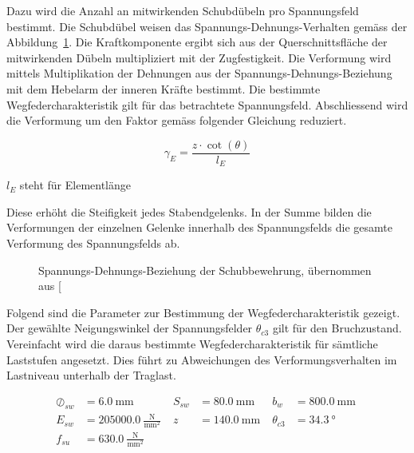 \documentclass[
  11pt,
  letterpaper,
]{scrreprt}
\begin{document}
Dazu wird die Anzahl an mitwirkenden Schubdübeln pro Spannungsfeld
bestimmt. Die Schubdübel weisen das Spannungs-Dehnungs-Verhalten gemäss
der Abbildung~\ref{fig-sigma-eps-a3v2}. Die Kraftkomponente ergibt sich
aus der Querschnittsfläche der mitwirkenden Dübeln multipliziert mit der
Zugfestigkeit. Die Verformung wird mittels Multiplikation der Dehnungen
aus der Spannungs-Dehnungs-Beziehung mit dem Hebelarm der inneren Kräfte
bestimmt. Die bestimmte Wegfedercharakteristik gilt für das betrachtete
Spannungsfeld. Abschliessend wird die Verformung um den Faktor gemäss
folgender Gleichung reduziert.

\[
\gamma_{E} = \frac{z \cdot \cot(\theta)}{l_{E}}
\]

\(l_{E}\) steht für Elementlänge

Diese erhöht die Steifigkeit jedes Stabendgelenks. In der Summe bilden
die Verformungen der einzelnen Gelenke innerhalb des Spannungsfelds die
gesamte Verformung des Spannungsfelds ab.

\begin{figure}[H]


\caption{\label{fig-sigma-eps-a3v2}Spannungs-Dehnungs-Beziehung der
Schubbewehrung, übernommen aus
{[}\citeproc{ref-gitz_ansatze_2024}{1}{]}}

\end{figure}%

Folgend sind die Parameter zur Bestimmung der Wegfedercharakteristik
gezeigt. Der gewählte Neigungswinkel der Spannungsfelder \(\theta_{c3}\)
gilt für den Bruchzustand. Vereinfacht wird die daraus bestimmte
Wegfedercharakteristik für sämtliche Laststufen angesetzt. Dies führt zu
Abweichungen des Verformungsverhalten im Lastniveau unterhalb der
Traglast.

$$
\begin{aligned}
\oslash_{sw} &= 6.0\ \mathrm{mm} \; 
 &S_{sw} &= 80.0\ \mathrm{mm} \; 
 &b_{w} &= 800.0\ \mathrm{mm} \; 
\\[11pt]
 E_{sw} &= 205000.0\ \frac{\mathrm{N}}{\mathrm{mm}^{2}} \; 
 &z &= 140.0\ \mathrm{mm} \; 
 &\theta_{c3} &= 34.3\ \mathrm{°} \; 
\\[11pt]
 f_{su} &= 630.0\ \frac{\mathrm{N}}{\mathrm{mm}^{2}} \;
\end{aligned}
$$
\end{document}
